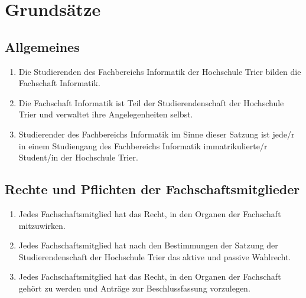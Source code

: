 \section{Grundsätze}

\singlespacing

\subsection{Allgemeines}
\begin{enumerate}
\item Die Studierenden des Fachbereichs Informatik der Hochschule Trier bilden die Fachschaft Informatik.
\item Die Fachschaft Informatik ist Teil der Studierendenschaft der Hochschule Trier und verwaltet ihre Angelegenheiten selbst.
\item Studierender des Fachbereichs Informatik im Sinne dieser Satzung ist jede/r in einem Studiengang des Fachbereichs Informatik immatrikulierte/r Student/in der Hochschule Trier.
\end{enumerate}

\subsection{Rechte und Pflichten der Fachschaftsmitglieder}
\begin{enumerate}
\item Jedes Fachschaftsmitglied hat das Recht, in den Organen der Fachschaft mitzuwirken.
\item Jedes Fachschaftsmitglied hat nach den Bestimmungen der Satzung der Studierendenschaft der Hochschule Trier das aktive und passive Wahlrecht.
\item Jedes Fachschaftsmitglied hat das Recht, in den Organen der Fachschaft gehört zu werden und Anträge zur Beschlussfassung vorzulegen.
\end{enumerate}
